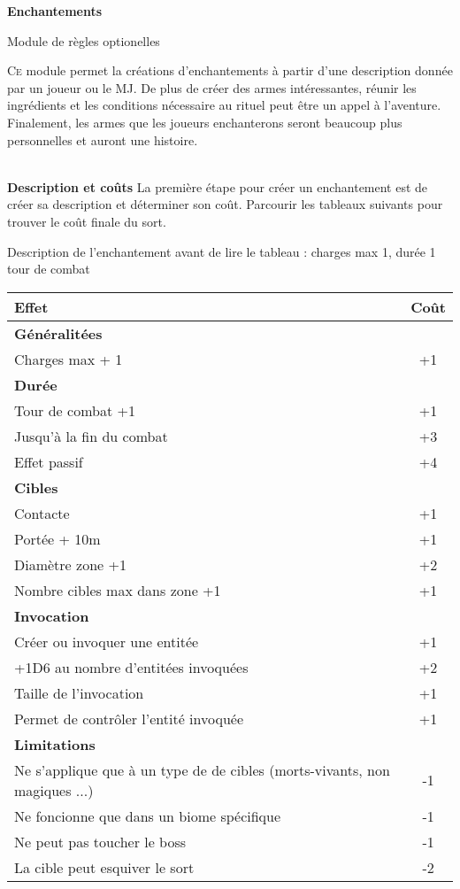 \documentclass[11pt]{article} %
\newcommand{\enluminure}[2]{\lettrine[lines=3]{\small \initfamily #1}{#2}}
\newcommand{\myjump}[1][1]{\mbox{}\\[#1cm]}
\begin{document}
\pagestyle{empty}

\begin{center}
    \textbf{Enchantements}

    Module de règles optionelles
\end{center}

\enluminure{C}{e} module permet la créations d'enchantements à partir d'une description donnée par un joueur ou le MJ. De plus de créer des armes intéressantes, réunir les ingrédients et les conditions nécessaire au rituel peut être un appel à l'aventure. Finalement, les armes que les joueurs enchanterons seront beaucoup plus personnelles et auront une histoire.



\myjump[0]
\textbf{\huge Description et coûts}\newline
La première étape pour créer un enchantement est de créer sa description et déterminer son coût. Parcourir les tableaux suivants pour trouver le coût finale du sort.\newline


Description de l'enchantement avant de lire le tableau : charges max 1, durée 1 tour de combat

\noindent
\begin{tabularx}{\linewidth}{|Xc|}
\hline

    \textbf{Effet} & \textbf{Coût}\\
    \hline
    \textbf{Généralitées} &\\
    Charges max + 1 & +1\\
    \hline
    \textbf{Durée} &\\
    Tour de combat +1 & +1\\
    Jusqu'à la fin du combat & +3\\
    Effet passif & +4\\
    \hline
    \textbf{Cibles} &\\
    Contacte & +1\\
    Portée + 10m & +1\\
    Diamètre zone +1 & +2\\
    Nombre cibles max dans zone +1 & +1\\
    \hline
    \textbf{Invocation} &\\
    Créer ou invoquer une entitée & +1\\
    +1D6 au nombre d'entitées invoquées & +2\\
    Taille de l'invocation & +1\\
    Permet de contrôler l'entité invoquée & +1\\
    \hline
    \textbf{Limitations} &\\
    Ne s'applique que à un type de de cibles (morts-vivants, non magiques ...) & -1\\
    Ne foncionne que dans un biome spécifique & -1\\
    Ne peut pas toucher le boss & -1\\
    La cible peut esquiver le sort & -2\\


\hline
\end{tabularx}
\end{document}
